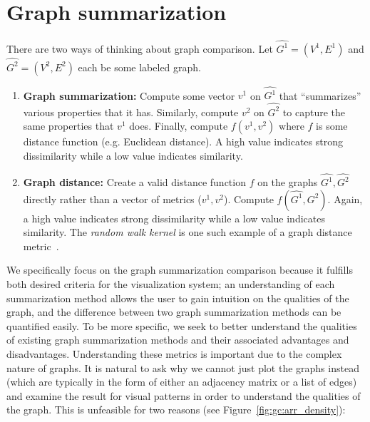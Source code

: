 \section{Graph summarization}
\label{sec:gc:litreview}

There are two ways of thinking about graph comparison. Let 
$\hat{G^1}=(V^1,E^1)$ and $\hat{G^2}=(V^2,E^2)$ each be some labeled graph. 

\tablespacing
\begin{enumerate}
	\item \textbf{Graph summarization:} Compute some vector 
	$v^1$ on $\hat{G^1}$ that ``summarizes'' various properties that
	it has. Similarly, compute $v^2$ on $\hat{G^2}$ to capture 
	the same properties that $v^1$ does. Finally, compute 
	$f(v^1,v^2)$ where $f$ is some distance 
	function (e.g. Euclidean distance). A high value indicates strong 
	dissimilarity while a low value indicates similarity. 
	
	\item \textbf{Graph distance:} Create a valid distance function $f$ on the 
	graphs $\hat{G^1}, \hat{G^2}$ directly rather than a vector of metrics 
	($v^1,v^2$). 
	Compute $f(\hat{G^1},\hat{G^2})$. Again, a high value indicates strong 
	dissimilarity while a low value indicates similarity. The \textit{random 
	walk kernel} is one such example of a graph distance 
	metric~\cite{vishwanathan2010}.
\end{enumerate}
\bodyspacing

We specifically focus on the graph summarization comparison because it 
fulfills both desired criteria for the visualization system; an understanding 
of each summarization method allows the user to gain intuition on the qualities 
of the graph, and the difference between two graph summarization methods can be 
quantified easily. To be more specific, we seek to better understand the 
qualities of existing graph summarization methods and their associated 
advantages and disadvantages. 
Understanding these metrics is important due to the complex nature of graphs.
It is natural to ask why we cannot just plot the graphs instead (which are 
typically in the form of either an adjacency matrix or a list of edges) and 
examine the result for visual patterns in order to understand the qualities 
of the graph. This is unfeasible for two reasons (see 
Figure~\ref{fig:gc:arr_density}):

